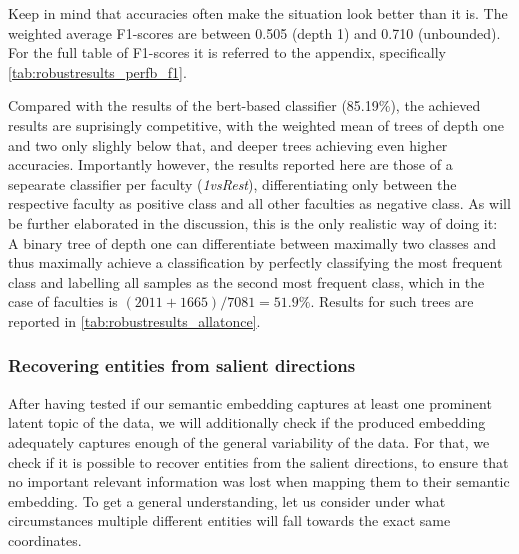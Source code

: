 Keep in mind that accuracies often make the situation look better than it is. The weighted average F1-scores are between 0.505 (depth 1) and 0.710 (unbounded). For the full table of F1-scores it is referred to the appendix, specifically \autoref{tab:robustresults_perfb_f1}. 

Compared with the results of the \gls{bert}-based classifier (85.19\%), the achieved results are suprisingly competitive, with the weighted mean of trees of depth one and two only slighly below that, and deeper trees achieving even higher accuracies. 
Importantly however, the results reported here are those of a sepearate classifier per faculty (\textit{1vsRest}), differentiating only between the respective faculty as positive class and all other faculties as negative class. As will be further elaborated in the discussion, this is the only realistic way of doing it: A binary tree of depth one can differentiate between maximally two classes and thus maximally achieve a classification by perfectly classifying the most frequent class and labelling all samples as the second most frequent class, which in the case of faculties is $(2011+1665)/7081=51.9\%$. Results for such trees are reported in \autoref{tab:robustresults_allatonce}.



\subsubsection{Recovering entities from salient directions}
\label{sec:duplicate_maps}

After having tested if our semantic embedding captures at least one prominent latent topic of the data, we will additionally check if the produced embedding adequately captures enough of the general variability of the data. For that, we check if it is possible to recover entities from the salient directions, to ensure that no important relevant information was lost when mapping them to their semantic embedding. To get a general understanding, let us consider under what circumstances multiple different entities will fall towards the exact same coordinates. 


